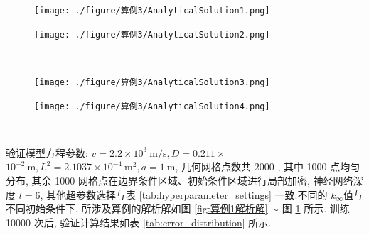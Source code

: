 \documentclass{Sichuan Normal University}
\begin{document}
\begin{figure}[H]
    \centering
    \begin{minipage}[c]{0.48\textwidth}
    \centering
    \texttt{[image: ./figure/算例3/AnalyticalSolution1.png]}
    \end{minipage}
    \hspace{0.02\textwidth}
    \begin{minipage}[c]{0.48\textwidth}
    \centering
    \texttt{[image: ./figure/算例3/AnalyticalSolution2.png]}
    \end{minipage}\\[3mm]
    \begin{minipage}[t]{0.48\textwidth}
    \centering
    \label{fig:算例1解析解}
    \end{minipage}
    \hspace{0.02\textwidth}
    \begin{minipage}[t]{0.48\textwidth}
    \centering
    \label{fig:算例2解析解}
    \end{minipage}
    \centering
    \begin{minipage}[c]{0.48\textwidth}
    \centering
    \texttt{[image: ./figure/算例3/AnalyticalSolution3.png]}
    \end{minipage}
    \hspace{0.02\textwidth}
    \begin{minipage}[c]{0.48\textwidth}
    \centering
    \texttt{[image: ./figure/算例3/AnalyticalSolution4.png]}
    \end{minipage}\\[3mm]
    \begin{minipage}[t]{0.48\textwidth}
    \centering
    \label{fig:算例3解析解}
    \end{minipage}
    \hspace{0.02\textwidth}
    \begin{minipage}[t]{0.48\textwidth}
    \centering
    \label{fig:算例4解析解}
    \end{minipage}
    \end{figure}
    
验证模型方程参数: $v=2.2 \times 10^3 \mathrm{~m} / \mathrm{s}, D=0.211 \times$ $10^{-2} \mathrm{~m}, L^2=2.1037 \times 10^{-4} \mathrm{~m}^2, a=1 \mathrm{~m}$, 
几何网格点数共 2000 , 其中 1000 点均匀分布, 其余 1000 网格点在边界条件区域、初始条件区域进行局部加密, 神经网络深度 $l=6$, 其他超参数选择与表 \ref{tab:hyperparameter_settings} 一致.不同的 $k_{\infty}$值与不同初始条件下, 
所涉及算例的解析解如图 \ref{fig:算例1解析解} $\sim$ 图 \ref{fig:算例4解析解} 所示. 训练 10000 次后, 验证计算结果如表 \ref{tab:error_distribution} 所示. 
\end{document}
